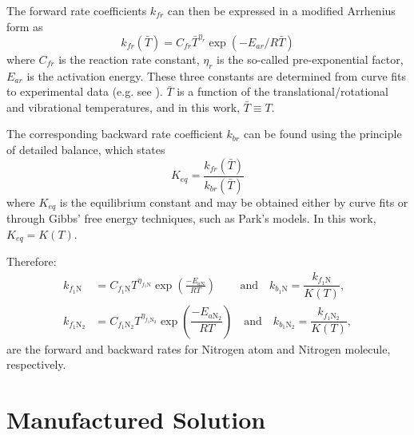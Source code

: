 \documentclass[10pt]{article}
\begin{document}
The forward rate coefficients  $k_{fr}$  can then be expressed in a modified Arrhenius form as
\begin{equation}
  k_{fr}\left(\bar{T}\right) = C_{fr} \bar{T}^{\eta_r} \exp \left(-E_{ar}/R\bar{T}\right)
\end{equation}
where $C_{fr}$ is the reaction rate constant, $\eta_r$ is the so-called pre-exponential factor, $E_{ar}$ is the activation energy.  These three constants are determined from curve fits to experimental data (e.g. see \cite{Ait1996}). $\bar{T}$ is a function of the translational/rotational and vibrational temperatures, and in this work, $\bar{T}\equiv T$.

The corresponding backward rate coefficient   $k_{br}$  can be found using the principle of detailed balance, which states
\begin{equation}\label{eq:equilibrium_constant}
  K_{eq} = \frac{k_{fr}\left(\bar{T}\right)}{k_{br}\left(\bar{T}\right)}
\end{equation}
where $K_{eq}$ is the equilibrium constant and may be obtained either by curve fits or through Gibbs' free energy techniques, such as Park's models. In this work, $K_{eq}=K(T)$.


Therefore:
\begin{equation}
 \begin{split}
\label{eq:forward_rates1}
k_{f_1 \text{N}} &= C_{f_1 \text{N}} T^{\eta_{f_1 \text{N}}} \exp\left(\frac{-E_{a\text{N}}}{R T}\right) \qquad \,\mbox{and}\quad k_{b_1 \text{N}} = \dfrac{k_{f_1 \text{N}}}{K(T)},\\
%
k_{f_1 \text{N}_2} &= C_{f_1 \text{N}_2} T^{\eta_{f_1 \text{N}_2}} \exp\left(\dfrac{-E_{a\text{N}_2}}{R T}\right) \quad \mbox{and}\quad k_{b_1 \text{N}_2} = \dfrac{k_{f_1 \text{N}_2}}{K(T)},
%
 \end{split}
\end{equation}
are the forward and backward rates for Nitrogen atom and Nitrogen molecule, respectively.



\section{Manufactured Solution}
\end{document}
